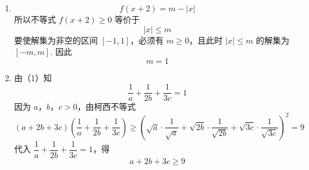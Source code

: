 \begin{solution}
\begin{enumerate}
\item
\[
f(x+2)=m-|x|
\]
所以不等式 \(f(x+2)\geqslant0\) 等价于
\[
|x|\leqslant m
\]
要使解集为非空的区间 \([-1,1]\)，必须有 \(m\geqslant0\)，且此时 \(|x|\leqslant m\) 的解集为 \([-m,m]\). 因此
\[
m=1
\]

\item 由（1）知
\[
\frac{1}{a}+\frac{1}{2b}+\frac{1}{3c}=1
\]
因为 \(a\)，\(b\)，\(c>0\)，由柯西不等式
\[
\left(a+2b+3c\right)\left(\frac{1}{a}+\frac{1}{2b}+\frac{1}{3c}\right)
\geqslant
\left(\sqrt{a}\cdot\frac{1}{\sqrt{a}}
+\sqrt{2b}\cdot\frac{1}{\sqrt{2b}}
+\sqrt{3c}\cdot\frac{1}{\sqrt{3c}}\right)^{2}
=9
\]
代入 \(\dfrac{1}{a}+\dfrac{1}{2b}+\dfrac{1}{3c}=1\)，得
\[
a+2b+3c\geqslant9
\]
\end{enumerate}
\end{solution}
